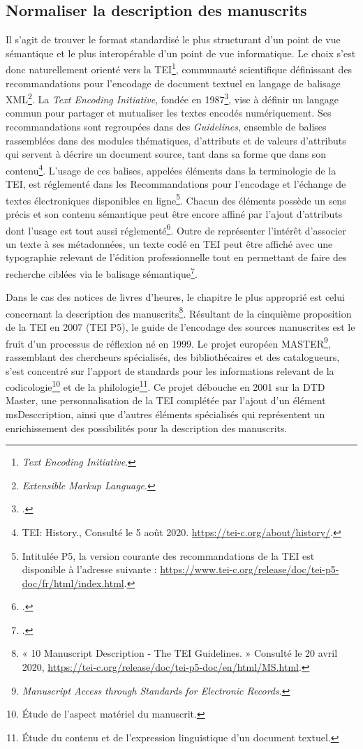 \documentclass[a4paper,12pt,twoside]{book}
\begin{document}
	
	\subsection{Normaliser la description des manuscrits }
	
	Il s'agit de trouver le format standardisé le plus structurant d'un point de vue sémantique et le plus interopérable d'un point de vue informatique. Le choix s'est donc naturellement orienté vers la TEI\footnote{\textit{Text Encoding Initiative}.}, communauté scientifique définissant des recommandations pour l'encodage de document textuel en langage de balisage XML\footnote{\textit{Extensible Markup Language}.}. La \textit{Text Encoding Initiative}, fondée en 1987\footcite[p. 31-34]{collection_bases_formats},  vise à définir un langage commun pour partager et mutualiser les textes encodés numériquement. Ses recommandations sont regroupées dans des \textit{Guidelines}, ensemble de balises rassemblées dans des modules thématiques, d'attributs et de valeurs d'attributs qui servent à décrire un document source, tant dans sa forme que dans son contenu\footnote{\og TEI: History.\fg{}, Consulté le 5 août 2020. \url{https://tei-c.org/about/history/}.}. L'usage de ces balises, appelées \og éléments\fg{} dans la terminologie de la TEI, est réglementé dans les \og Recommandations pour l'encodage et l'échange de textes électroniques\fg{} disponibles en ligne\footnote{Intitulée P5, la version courante des recommandations de la TEI est disponible à l'adresse suivante : \url{https://www.tei-c.org/release/doc/tei-p5-doc/fr/html/index.html}.}. Chacun des éléments possède un sens précis et son contenu sémantique peut être encore affiné par l'ajout d'attributs dont l'usage est tout aussi réglementé\footcite[p. 25]{encoder_auto_catalogue}. Outre de représenter l'intérêt d'associer un texte à ses métadonnées, un texte codé en TEI peut être affiché avec une typographie relevant de l'édition professionnelle tout en permettant de faire des recherche ciblées via le balisage sémantique\footcite[p. 128]{OCR_normalisation_codage}. 

Dans le cas des notices de livres d'heures, le chapitre le plus approprié est celui concernant la description des manuscrits\footnote{« 10 Manuscript Description - The TEI Guidelines. » Consulté le 20 avril 2020, \url{https://tei-c.org/release/doc/tei-p5-doc/en/html/MS.html}.}. Résultant de la cinquième proposition de la TEI en 2007 (TEI P5), le guide de l'encodage des sources manuscrites est le fruit d'un processus de réflexion né en 1999. Le projet européen MASTER\footnote{\textit{Manuscript Access through Standards for Electronic Records}.}, rassemblant des chercheurs spécialisés, des bibliothécaires et des catalogueurs, s'est concentré sur l'apport de standards pour les informations relevant de la codicologie\footnote{Étude de l'aspect matériel du manuscrit.} et de la philologie\footnote{Étude du contenu et de l'expression linguistique d'un document textuel.}. Ce projet débouche en 2001 sur la DTD Master, une personnalisation de la TEI complétée par l'ajout d'un élément msDesccription, ainsi que d'autres éléments spécialisés qui représentent un enrichissement des possibilités pour la description des manuscrits.\\
\end{document}
